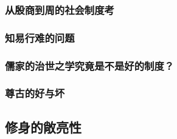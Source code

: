 \documentclass[10pt,a4paper]{article}
\begin{document}
\subsubsection{从殷商到周的社会制度考}
\label{sec:org1092f69}

\subsubsection{知易行难的问题}
\label{sec:org2eebc55}

\subsubsection{儒家的治世之学究竟是不是好的制度？}
\label{sec:orgf9a72ba}

\subsubsection{尊古的好与坏}
\label{sec:org0d1e1a4}

\subsection{修身的敞亮性}
\label{sec:org9953788}
\end{document}
